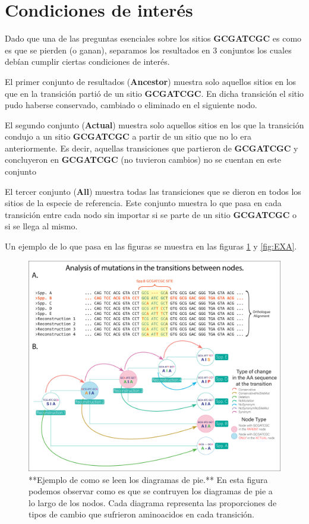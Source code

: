 \documentclass[
]{book}
\begin{document}
\hypertarget{condiciones-de-interuxe9s}{%
\section{Condiciones de interés}\label{condiciones-de-interuxe9s}}

Dado que una de las preguntas esenciales sobre los sitios \textbf{GCGATCGC} es como es que se pierden (o ganan), separamos los resultados en 3 conjuntos los cuales debían cumplir ciertas condiciones de interés.

El primer conjunto de resultados (\textbf{Ancestor}) muestra solo aquellos sitios en los que en la transición partió de un sitio \textbf{GCGATCGC}. En dicha transición el sitio pudo haberse conservado, cambiado o eliminado en el siguiente nodo.

El segundo conjunto (\textbf{Actual}) muestra solo aquellos sitios en los que la transición condujo a un sitio \textbf{GCGATCGC} a partir de un sitio que no lo era anteriormente. Es decir, aquellas transiciones que partieron de \textbf{GCGATCGC} y concluyeron en \textbf{GCGATCGC} (no tuvieron cambios) no se cuentan en este conjunto

El tercer conjunto (\textbf{All}) muestra todas las transiciones que se dieron en todos los sitios de la especie de referencia. Este conjunto muestra lo que pasa en cada transición entre cada nodo sin importar si se parte de un sitio \textbf{GCGATCGC} o si se llega al mismo.

Un ejemplo de lo que pasa en las figuras se muestra en las figuras \ref{fig:FIG4} y \ref{fig:EXA}.

\begin{figure}

{\centering \includegraphics[width=1\linewidth]{Clados/Calothrix_B/figures/Reconstruction_explanation} 

}

\caption{**Ejemplo de como se leen los diagramas de pie.** En esta figura podemos observar como es que se contruyen los diagramas de pie a lo largo de los nodos. Cada diagrama representa las proporciones de tipos de cambio que sufrieron aminoacidos en cada transición.}\label{fig:FIG4}
\end{figure}
\end{document}
